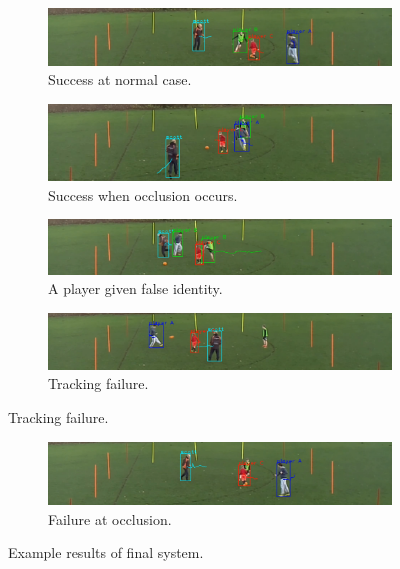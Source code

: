 \documentclass{article}
\begin{document}
\begin{figure}[h!]
  \begin{subfigure}[b]{\linewidth}
  \centering
    \includegraphics[scale=0.2]{report/pic/3_new/no_occlusion.png} 
    \caption{Success at normal case.}
  \end{subfigure}
  \begin{subfigure}[b]{\linewidth}
  \centering
    \includegraphics[scale=0.2]{report/pic/3_new/success.png} 
    \caption{Success when occlusion occurs.}
  \end{subfigure}
  \begin{subfigure}[b]{\linewidth}
  \centering
    \includegraphics[scale=0.2]{report/pic/3_new/false_identity.png} 
    \caption{A player given false identity.}
  \end{subfigure}
  \begin{subfigure}[b]{\linewidth}
  \centering
    \includegraphics[scale=0.2]{report/pic/3_new/false_negative.png} 
    \caption{Tracking failure.}
  \end{subfigure}
  \caption{Tracking failure.}
  \begin{subfigure}[b]{\linewidth}
  \centering
    \includegraphics[scale=0.2]{report/pic/3_new/occlu_fail.png} 
    \caption{Failure at occlusion.}
  \end{subfigure}
  \caption{Example results of final system.}
\end{figure}
\end{document}
